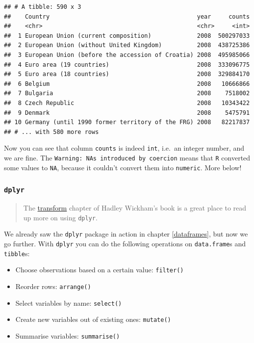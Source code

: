 \documentclass[]{book}
\providecommand{\tightlist}{%
  \setlength{\itemsep}{0pt}\setlength{\parskip}{0pt}}
\theoremstyle{definition}
\theoremstyle{definition}
\theoremstyle{definition}
\theoremstyle{remark}
\begin{document}
\begin{verbatim}
## # A tibble: 590 x 3
##    Country                                          year     counts
##    <chr>                                            <chr>     <int>
##  1 European Union (current composition)             2008  500297033
##  2 European Union (without United Kingdom)          2008  438725386
##  3 European Union (before the accession of Croatia) 2008  495985066
##  4 Euro area (19 countries)                         2008  333096775
##  5 Euro area (18 countries)                         2008  329884170
##  6 Belgium                                          2008   10666866
##  7 Bulgaria                                         2008    7518002
##  8 Czech Republic                                   2008   10343422
##  9 Denmark                                          2008    5475791
## 10 Germany (until 1990 former territory of the FRG) 2008   82217837
## # ... with 580 more rows
\end{verbatim}

Now you can see that column \texttt{counts} is indeed \texttt{int},
i.e.~an integer number, and we are fine. The
\texttt{Warning:\ NAs\ introduced\ by\ coercion} means that \texttt{R}
converted some values to \texttt{NA}, because it couldn't convert them
into \texttt{numeric}. More below!

\subsubsection{\texorpdfstring{\texttt{dplyr}}{dplyr}}\label{dplyr}

\begin{quote}
The \href{http://r4ds.had.co.nz/transform.html}{transform} chapter of
Hadley Wickham's book is a great place to read up more on using
\texttt{dplyr}.
\end{quote}

We already saw the \texttt{dplyr} package in action in chapter
\ref{dataframes}, but now we go further. With \texttt{dplyr} you can do
the following operations on \texttt{data.frame}s and \texttt{tibble}s:

\begin{itemize}
\tightlist
\item
  Choose observations based on a certain value: \texttt{filter()}
\item
  Reorder rows: \texttt{arrange()}
\item
  Select variables by name: \texttt{select()}
\item
  Create new variables out of existing ones: \texttt{mutate()}
\item
  Summarise variables: \texttt{summarise()}
\end{itemize}
\end{document}
